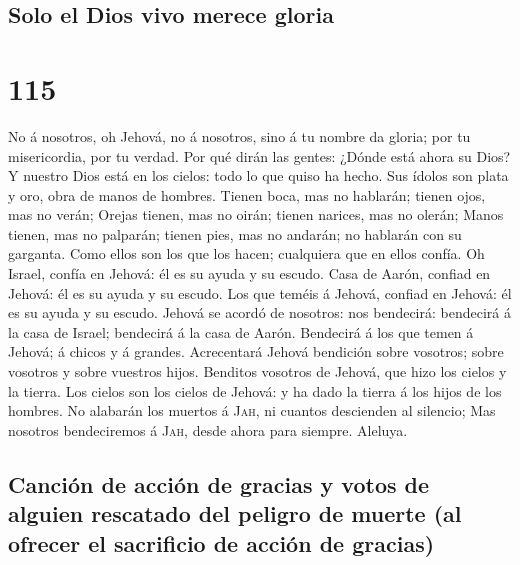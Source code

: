 \hypertarget{solo-el-dios-vivo-merece-gloria}{%
\subsection{Solo el Dios vivo merece
gloria}\label{solo-el-dios-vivo-merece-gloria}}

\hypertarget{section-114}{%
\section{115}\label{section-114}}

 No á nosotros, oh Jehová, no á nosotros, sino á tu nombre
da gloria; por tu misericordia, por tu verdad.  Por qué
dirán las gentes: ¿Dónde está ahora su Dios?  Y nuestro
Dios está en los cielos: todo lo que quiso ha hecho.  Sus
ídolos son plata y oro, obra de manos de hombres.  Tienen
boca, mas no hablarán; tienen ojos, mas no verán;  Orejas
tienen, mas no oirán; tienen narices, mas no olerán; 
Manos tienen, mas no palparán; tienen pies, mas no andarán; no hablarán
con su garganta.  Como ellos son los que los hacen;
cualquiera que en ellos confía.  Oh Israel, confía en
Jehová: él es su ayuda y su escudo.  Casa de Aarón,
confiad en Jehová: él es su ayuda y su escudo.  Los que
teméis á Jehová, confiad en Jehová: él es su ayuda y su escudo.
 Jehová se acordó de nosotros: nos bendecirá: bendecirá á
la casa de Israel; bendecirá á la casa de Aarón. 
Bendecirá á los que temen á Jehová; á chicos y á grandes.
 Acrecentará Jehová bendición sobre vosotros; sobre
vosotros y sobre vuestros hijos.  Benditos vosotros de
Jehová, que hizo los cielos y la tierra.  Los cielos son
los cielos de Jehová: y ha dado la tierra á los hijos de los hombres.
 No alabarán los muertos á \textsc{Jah}, ni cuantos
descienden al silencio;  Mas nosotros bendeciremos á
\textsc{Jah}, desde ahora para siempre. Aleluya.

\hypertarget{canciuxf3n-de-acciuxf3n-de-gracias-y-votos-de-alguien-rescatado-del-peligro-de-muerte-al-ofrecer-el-sacrificio-de-acciuxf3n-de-gracias}{%
\subsection{Canción de acción de gracias y votos de alguien rescatado
del peligro de muerte (al ofrecer el sacrificio de acción de
gracias)}\label{canciuxf3n-de-acciuxf3n-de-gracias-y-votos-de-alguien-rescatado-del-peligro-de-muerte-al-ofrecer-el-sacrificio-de-acciuxf3n-de-gracias}}

